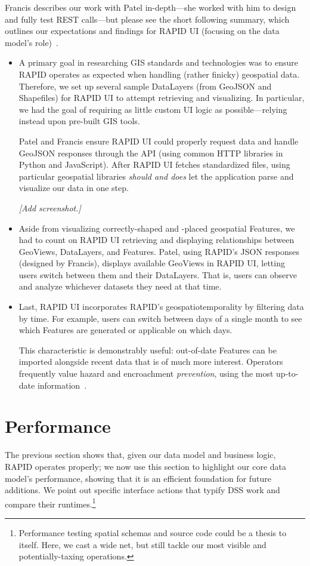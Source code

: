 Francis describes our work with Patel in-depth---she worked with him to design and fully test REST calls---but please see the short following summary, which outlines our expectations and findings for RAPID UI (focusing on the data model's role)~\cite{Francis}.

\begin{itemize}
\item A primary goal in researching GIS standards and technologies was to ensure RAPID operates as expected when handling (rather finicky) geospatial data. Therefore, we set up several sample DataLayers (from GeoJSON and Shapefiles) for RAPID UI to attempt retrieving and visualizing. In particular, we had the goal of requiring as little custom UI logic as possible---relying instead upon pre-built GIS tools.

Patel and Francis ensure RAPID UI could properly request data and handle GeoJSON responses through the API (using common HTTP libraries in Python and JavaScript). After RAPID UI fetches standardized files, using particular geospatial libraries \textit{should and does} let the application parse and visualize our data in one step.

\textit{[Add screenshot.]}

\item Aside from visualizing correctly-shaped and -placed geospatial Features, we had to count on RAPID UI retrieving and displaying relationships between GeoViews, DataLayers, and Features. Patel, using RAPID's JSON responses (designed by Francis), displays available GeoViews in RAPID UI, letting users switch between them and their DataLayers. That is, users can observe and analyze whichever datasets they need at that time.

\item Last, RAPID UI incorporates RAPID's geospatiotemporality by filtering data by time. For example, users can switch between days of a single month to see which Features are generated or applicable on which days.

This characteristic is demonstrably useful: out-of-date Features can be imported alongside recent data that is of much more interest. Operators frequently value hazard and encroachment \textit{prevention}, using the most up-to-date information~\cite{Dunning2013}.
\end{itemize}

\section{Performance}
The previous section shows that, given our data model and business logic, RAPID operates properly; we now use this section to highlight our core data model's performance, showing that it is an efficient foundation for future additions. We point out specific interface actions that typify DSS work and compare their runtimes.\footnote{Performance testing spatial schemas and source code could be a thesis to itself. Here, we cast a wide net, but still tackle our most visible and potentially-taxing operations.}

